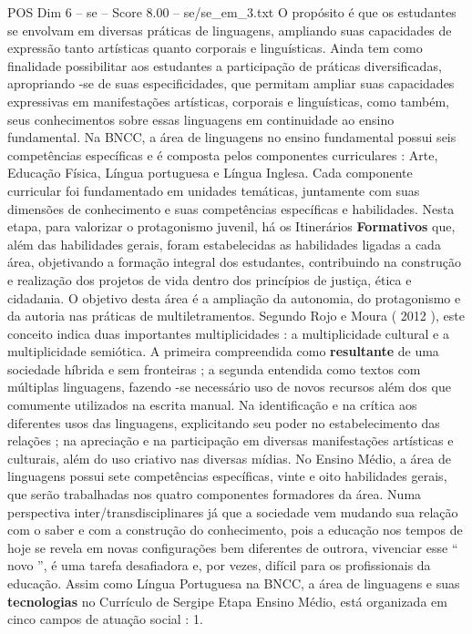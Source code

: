 \begin{textsample}{POS Dim 6 – se – Score 8.00 – se/se\_em\_3.txt}
O propósito é que os estudantes se envolvam em diversas práticas de linguagens, ampliando suas capacidades de expressão tanto artísticas quanto corporais e linguísticas.
Ainda tem como finalidade possibilitar aos estudantes a participação de práticas diversificadas, apropriando -se de suas especificidades, que permitam ampliar suas capacidades expressivas em manifestações artísticas, corporais e linguísticas, como também, seus conhecimentos sobre essas linguagens em continuidade ao ensino fundamental.
Na BNCC, a área de linguagens no ensino fundamental possui seis competências específicas e é composta pelos componentes curriculares : Arte, Educação Física, Língua portuguesa e Língua Inglesa.
Cada componente curricular foi fundamentado em unidades temáticas, juntamente com suas dimensões de conhecimento e suas competências específicas e habilidades.
Nesta etapa, para valorizar o protagonismo juvenil, há os Itinerários \textbf{Formativos} que, além das habilidades gerais, foram estabelecidas as habilidades ligadas a cada área, objetivando a formação integral dos estudantes, contribuindo na construção e realização dos projetos de vida dentro dos princípios de justiça, ética e cidadania.
O objetivo desta área é a ampliação da autonomia, do protagonismo e da autoria nas práticas de multiletramentos.
Segundo Rojo e Moura ( 2012 ), este conceito indica duas importantes multiplicidades : a multiplicidade cultural e a multiplicidade semiótica.
A primeira compreendida como \textbf{resultante} de uma sociedade híbrida e sem fronteiras ; a segunda entendida como textos com múltiplas linguagens, fazendo -se necessário uso de novos recursos além dos que comumente utilizados na escrita manual.
Na identificação e na crítica aos diferentes usos das linguagens, explicitando seu poder no estabelecimento das relações ; na apreciação e na participação em diversas manifestações artísticas e culturais, além do uso criativo nas diversas mídias.
No Ensino Médio, a área de linguagens possui sete competências específicas, vinte e oito habilidades gerais, que serão trabalhadas nos quatro componentes formadores da área.
Numa perspectiva inter/transdisciplinares já que a sociedade vem mudando sua relação com o saber e com a construção do conhecimento, pois a educação nos tempos de hoje se revela em novas configurações bem diferentes de outrora, vivenciar esse “ novo ”, é uma tarefa desafiadora e, por vezes, difícil para os profissionais da educação.
Assim como Língua Portuguesa na BNCC, a área de linguagens e suas \textbf{tecnologias} no Currículo de Sergipe Etapa Ensino Médio, está organizada em cinco campos de atuação social : 1.

\end{textsample}
